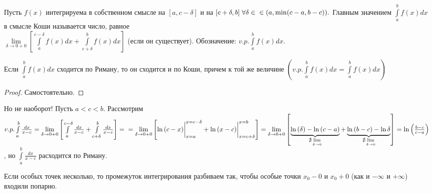 \documentclass[../main.tex]{subfiles}
\begin{document}
\begin{definition}
Пусть $f(x)$ интегрируема в собственном смысле на $[a,c-\delta]$ и на $[c+\delta,b]\; \forall \delta\in\\\in(a,\min(c-a,b-c)).$ Главным значением $\int\limits_{a  }^{b    } f(x)dx$ в смысле Коши называется число, равное \\$\lim\limits_{\delta\to 0+0}\left[\int\limits_{a}^{c-\delta}f(x)dx +\int\limits_{c+\delta}^{b}f(x)dx\right]$ (если он существует). Обозначение: $v.p.\int\limits_{a}^{b}f(x)dx$.
\end{definition}
\begin{theorem}
Если $\int\limits_{a}^{b}f(x)dx$ сходится по Риману, то он сходится и по Коши, причем к той же величине $\left(v.p.\int\limits_{a}^{b}f(x)dx=\int\limits_{a}^{b}f(x)dx\right)$
\end{theorem}
\begin{proof}
Самостоятельно.
\end{proof}
Но не наоборот! Пусть $a<c<b.$ Рассмотрим $v.p. \int\limits_{a   }^{b    } \frac{dx}{x-c}=\lim\limits_{\delta            \to 0+0}\left[\int\limits_{a  }^{c-\delta}\frac{dx}{x-c}+\int\limits_{c+\delta}^{b}\frac{dx}{x-c}\right]=\\=\lim\limits_{\delta        \to 0+0}\left[\ln{(c-x)}\bigg|_{x=a}^{x=c-\delta} +\ln{(x-c)}\bigg|_{x=c+\delta}^{x=b} \right]= \lim\limits_{\delta\to 0+0} \left[\underbrace{\ln{(\delta)}-\ln{(c-a)}}_{\nexists \lim\limits_{\delta\to 0} }+\underbrace{\ln{(b-c)}-\ln{\delta}}_{\nexists \lim\limits_{\delta\to 0} }\right]=\ln{\left(\frac{b-c}{c-a}\right)}$, но $\int\limits_{a   }^{b    } \frac{dx}{x-c}$ расходится по Риману. 

Если особых точек несколько, то промежуток интегрирования разбиваем так, чтобы особые точки $x_{0}-0$ и $x_{0}+0$ (как и $-\infty$ и $+\infty$) входили попарно. 
\end{document}
